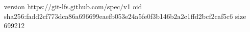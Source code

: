 version https://git-lfs.github.com/spec/v1
oid sha256:fadd2cf773dca86a696699eaefb053e24a5fe0f3b146b2a2c1ffd2bcf2caf5c6
size 699212
